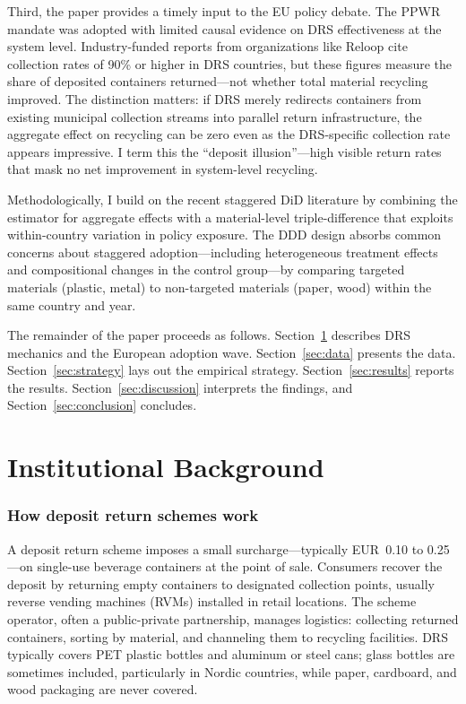 \documentclass[12pt]{article}
\begin{document}
Third, the paper provides a timely input to the EU policy debate. The PPWR mandate \citep{euPPWR2024} was adopted with limited causal evidence on DRS effectiveness at the system level. Industry-funded reports from organizations like Reloop \citep{reloop2023drs} cite collection rates of 90\% or higher in DRS countries, but these figures measure the share of deposited containers returned---not whether total material recycling improved. The distinction matters: if DRS merely redirects containers from existing municipal collection streams into parallel return infrastructure, the aggregate effect on recycling can be zero even as the DRS-specific collection rate appears impressive. I term this the ``deposit illusion''---high visible return rates that mask no net improvement in system-level recycling.

Methodologically, I build on the recent staggered DiD literature \citep{goodmanbacon2021difference, deChaisemartin2020two, sunAbraham2021, roth2023pretrends, borusyak2024revisiting, athey2022design} by combining the \citet{callaway2021difference} estimator for aggregate effects with a material-level triple-difference that exploits within-country variation in policy exposure. The DDD design absorbs common concerns about staggered adoption---including heterogeneous treatment effects and compositional changes in the control group---by comparing targeted materials (plastic, metal) to non-targeted materials (paper, wood) within the same country and year.

The remainder of the paper proceeds as follows. Section~\ref{sec:background} describes DRS mechanics and the European adoption wave. Section~\ref{sec:data} presents the data. Section~\ref{sec:strategy} lays out the empirical strategy. Section~\ref{sec:results} reports the results. Section~\ref{sec:discussion} interprets the findings, and Section~\ref{sec:conclusion} concludes.


\section{Institutional Background}
\label{sec:background}

\subsubsection*{How deposit return schemes work} A deposit return scheme imposes a small surcharge---typically EUR~0.10 to 0.25---on single-use beverage containers at the point of sale. Consumers recover the deposit by returning empty containers to designated collection points, usually reverse vending machines (RVMs) installed in retail locations. The scheme operator, often a public-private partnership, manages logistics: collecting returned containers, sorting by material, and channeling them to recycling facilities. DRS typically covers PET plastic bottles and aluminum or steel cans; glass bottles are sometimes included, particularly in Nordic countries, while paper, cardboard, and wood packaging are never covered.
\end{document}
